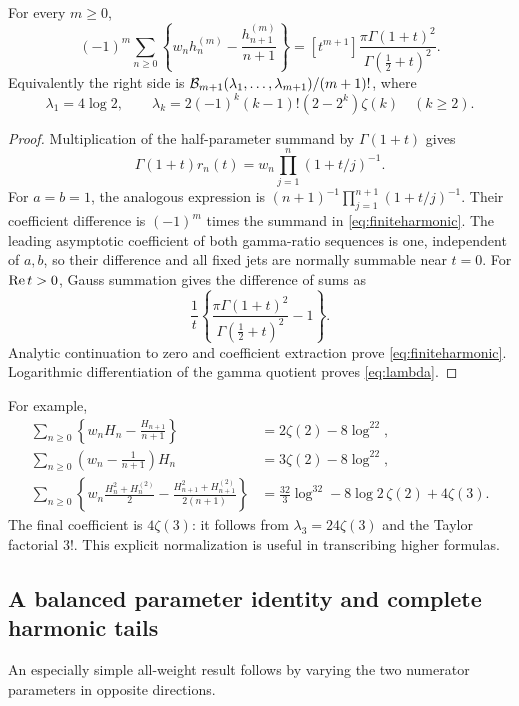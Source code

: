 \begin{proposition}\label{prop:finiteharmonic}
For every $m\ge0$,
\begin{equation}\label{eq:finiteharmonic}
 (-1)^m\sum_{n\ge0}
 \left\{w_n h_n^{(m)}-\frac{h_{n+1}^{(m)}}{n+1}\right\}
 =[t^{m+1}]\frac{\pi\Gamma(1+t)^2}{\Gamma(\tfrac12+t)^2}.
\end{equation}
Equivalently the right side is
$\mathcal B_{m+1}(\lambda_1,\ldots,\lambda_{m+1})/(m+1)!$, where
\begin{equation}\label{eq:lambda}
 \lambda_1=4\log2,\qquad
 \lambda_k=2(-1)^k(k-1)!(2-2^k)\zeta(k)\quad(k\ge2).
\end{equation}
\end{proposition}
\begin{proof}
Multiplication of the half-parameter summand by $\Gamma(1+t)$ gives
\[
 \Gamma(1+t)r_n(t)
 =w_n\prod_{j=1}^n(1+t/j)^{-1}.
\]
For $a=b=1$, the analogous expression is
$(n+1)^{-1}\prod_{j=1}^{n+1}(1+t/j)^{-1}$.
Their coefficient difference is $(-1)^m$ times the summand in
\eqref{eq:finiteharmonic}.  The leading asymptotic coefficient of both
gamma-ratio sequences is one, independent of $a,b$, so their difference
and all fixed jets are normally summable near $t=0$.
For $\operatorname{Re} t>0$, Gauss summation gives the difference of sums as
\[
 \frac1t\left\{\frac{\pi\Gamma(1+t)^2}
                         {\Gamma(\tfrac12+t)^2}-1\right\}.
\]
Analytic continuation to zero and coefficient extraction prove
\eqref{eq:finiteharmonic}.  Logarithmic differentiation of the gamma quotient
proves \eqref{eq:lambda}.
\end{proof}

For example,
\begin{align}
 \sum_{n\ge0}\left\{w_nH_n-\frac{H_{n+1}}{n+1}\right\}
 &=2\zeta(2)-8\log^22,\label{eq:finiteh1}\\
 \sum_{n\ge0}\left(w_n-\frac1{n+1}\right)H_n
 &=3\zeta(2)-8\log^22,\label{eq:finiteh1b}\\
 \sum_{n\ge0}\left\{
 w_n\frac{H_n^2+H_n^{(2)}}2
 -\frac{H_{n+1}^2+H_{n+1}^{(2)}}{2(n+1)}\right\}
 &=\frac{32}{3}\log^32-8\log2\,\zeta(2)+4\zeta(3).
 \label{eq:finiteh2}
\end{align}
The final coefficient is $4\zeta(3)$: it follows from
$\lambda_3=24\zeta(3)$ and the Taylor factorial $3!$.
This explicit normalization is useful in transcribing higher formulas.

\subsection{A balanced parameter identity and complete harmonic tails}
An especially simple all-weight result follows by varying the two numerator
parameters in opposite directions.

